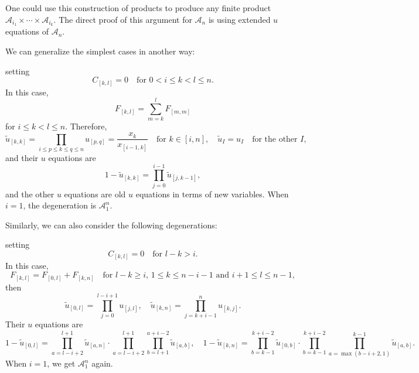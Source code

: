 \documentclass[hidelinks,12pt]{article}
\begin{document}
One could use this construction of products to produce any finite product $\mathscr A_{i_1}\times \cdots \times \mathscr A_{i_k}$.
The direct proof of this argument for $\mathscr A_n$ is using extended $u$ equations \cite{Brown:2009qja,Arkani-Hamed:2019plo} of $\mathscr A_n$. 

We can generalize the simplest cases in another way:
\begin{center}
\end{center}
setting 
\[
C_{[k,l]}=0 \quad \text{for $0<i\leq k< l\leq n$}.
\]
In this case, 
\[
F_{[k,l]}=\sum_{m=k}^l F_{[m,m]}
\]
for $i\leq k < l \leq n$. Therefore,
\[
\tilde u_{[k,k]}=\prod_{i\leq p\leq k\leq q \leq n}u_{[p,q]}=\frac{x_k}{x_{[i-1,k]}}\quad 
\text{for $k\in [i,n]$},\quad \tilde u_I=u_I\quad \text{for the other $I$},
\]
and their $u$ equations are
\begin{equation}
1-\tilde u_{[k,k]}=\prod_{j=0}^{i-1}\tilde u_{[j,k-1]},
\end{equation}
and the other $u$ equations are old $u$ equations in terms of new variables.
When $i=1$, the degeneration is $\mathscr A_1^n$.

Similarly, we can also consider the following degenerations:
\begin{center}
\end{center}
setting
\[
C_{[k,l]}=0 \quad \text{for $l-k>i$}.
\]
In this case,
\[
F_{[k,l]}=F_{[0,l]}+F_{[k,n]}\quad \text{for $l-k\geq i$, $1\leq k\leq n-i-1$ and $i+1\leq l\leq n-1$},
\]
then 
\[
\tilde u_{[0,l]}=\prod_{j=0}^{l-i+1}  u_{[j,l]},\quad 
\tilde u_{[k,n]}=\prod_{j=k+i-1}^{n}  u_{[k,j]}.
\]
Their $u$ equations are 
\begin{equation}
1-\tilde u_{[0,l]}=\prod_{a=l-i+2}^{l+1}\tilde u_{[a,n]}\cdot\prod_{a=l-i+2}^{l+1}\prod_{b=l+1}^{a+i-2} \tilde u_{[a,b]},\quad
1-\tilde u_{[k,n]}=\prod_{b=k-1}^{k+i-2}\tilde u_{[0,b]}\cdot \prod_{b=k-1}^{k+i-2}\prod_{a=\max(b-i+2,1)}^{k-1} \tilde u_{[a,b]}.
\end{equation}
When $i=1$, we get $\mathscr A_1^n$ again.
\end{document}
